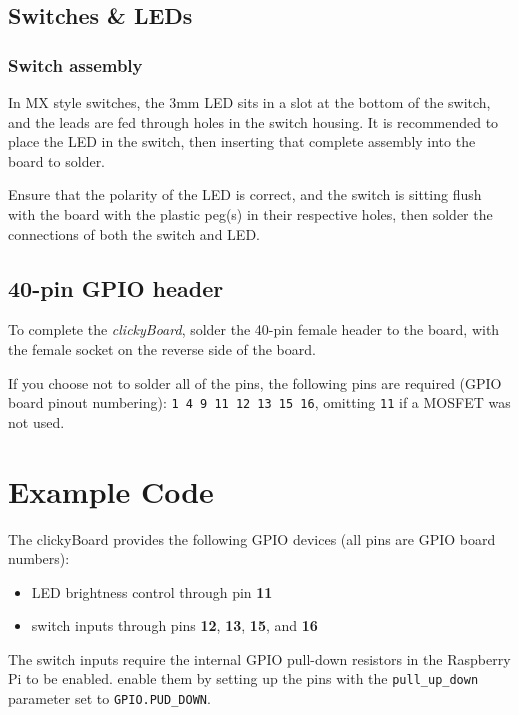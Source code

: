 \documentclass[10pt, a4paper, onesided]{article}
\begin{document}
	\subsection*{Switches \& LEDs}
	
		\subsubsection*{Switch assembly}
	
			In MX style switches, the 3mm LED sits in a slot at the bottom of the switch, and the leads are fed through holes in the switch housing. It is recommended to place the LED in the switch, then inserting that complete assembly into the board to solder.
			
			Ensure that the polarity of the LED is correct, and the switch is sitting flush with the board with the plastic peg(s) in their respective holes, then solder the connections of both the switch and LED.
	
	\subsection*{40-pin GPIO header}
	
		To complete the \textit{clickyBoard}, solder the 40-pin female header to the board, with the female socket on the reverse side of the board.
		
		If you choose not to solder all of the pins, the following pins are required (GPIO board pinout numbering): 
		\texttt{1 4 9 11 12 13 15 16}, omitting \texttt{11} if a MOSFET was not used.


\newpage
\section{Example Code}

The clickyBoard provides the following GPIO devices (all pins are GPIO board numbers):

\begin{itemize}[nosep]
	\item LED brightness control through pin \textbf{11}
	\item switch inputs through pins \textbf{12}, \textbf{13}, \textbf{15}, and \textbf{16}
\end{itemize}

The switch inputs require the internal GPIO pull-down resistors in the Raspberry Pi to be enabled. enable them by setting up the pins with the \texttt{pull\_up\_down} parameter set to \texttt{GPIO.PUD\_DOWN}.
\end{document}
